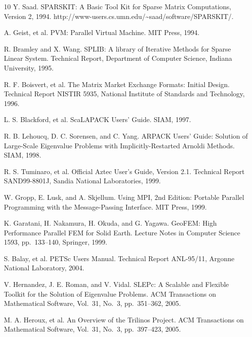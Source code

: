 \documentclass[a4paper]{jarticle}
\begin{document}
{{\begin{thebibliography}{10}
Y. Saad.
\newblock SPARSKIT: A Basic Tool Kit for Sparse Matrix Computations,
  Version 2, 1994.
\newblock http://www-users.cs.umn.edu/\textasciitilde saad/software/SPARSKIT/.

A. Geist, et al.
\newblock PVM: Parallel Virtual Machine.
\newblock MIT Press, 1994.

R. Bramley and X. Wang.
\newblock SPLIB: A library of Iterative Methods for Sparse Linear System.
\newblock Technical Report, Department of Computer Science, Indiana University, 1995.

R. F. Boisvert, et al. 
\newblock The Matrix Market Exchange Formats: Initial Design. 
\newblock Technical Report NISTIR 5935, National Institute of Standards and
	Technology, 1996.

L. S. Blackford, et al.
\newblock ScaLAPACK Users' Guide.
\newblock SIAM, 1997.

R. B. Lehoucq, D. C. Sorensen, and C. Yang.
\newblock ARPACK Users' Guide: Solution of Large-Scale Eigenvalue Problems with Implicitly-Restarted Arnoldi Methods. 
\newblock SIAM, 1998. 

R. S. Tuminaro, et al.
\newblock Official Aztec User's Guide, Version 2.1.
\newblock Technical Report SAND99-8801J, Sandia National Laboratories, 1999.

W. Gropp, E. Lusk, and A. Skjellum.
\newblock Using MPI, 2nd Edition: Portable Parallel Programming with the
	Message-Passing Interface.
\newblock MIT Press, 1999.

K. Garatani, H. Nakamura, H. Okuda, and G. Yagawa.
\newblock GeoFEM: High Performance Parallel FEM for Solid Earth.
\newblock Lecture Notes in Computer Science 1593, pp.\ 133--140, Springer, 1999.

S. Balay, et al.
\newblock PETSc Users Manual.
\newblock Technical Report ANL-95/11, Argonne National Laboratory, 2004.

V. Hernandez, J. E. Roman, and V. Vidal.
\newblock SLEPc: A Scalable and Flexible Toolkit for the Solution of
	Eigenvalue Problems.
\newblock ACM Transactions on Mathematical Software,  Vol.~31, No.~3, pp.\ 351--362, 2005.

M. A. Heroux, et al.
\newblock An Overview of the Trilinos Project.
\newblock ACM Transactions on Mathematical Software,  Vol.~31, No.~3, pp.\ 397--423, 2005.


\end{thebibliography}}}
\end{document}

